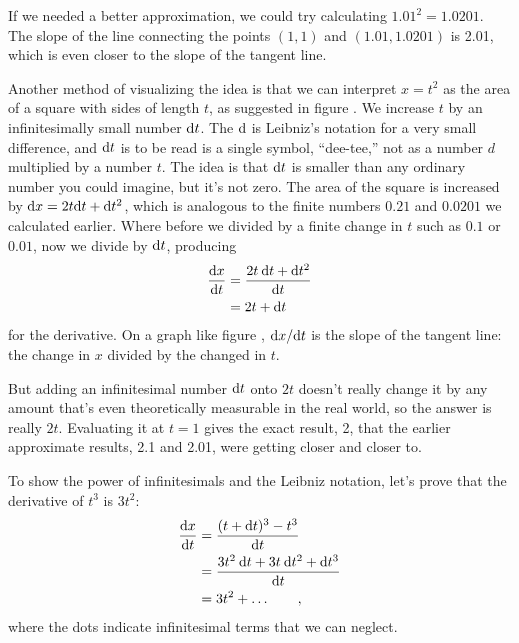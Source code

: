 If we needed a better approximation, we could try calculating $1.01^2=1.0201$. The slope of the
line connecting the points $(1,1)$ and $(1.01,1.0201)$ is 2.01, which is even closer to the slope of the tangent line.

%
%
Another method of visualizing the idea is that we can interpret $x=t^2$ as the area of a square with sides of length $t$,
as suggested in figure . We increase $t$ by an infinitesimally small number $\textup{d} t$.
The $\textup{d}$ is Leibniz's notation for a very small difference,
and $\textup{d} t$ is to be read is a single symbol,
``dee-tee,'' not as a number $d$ multiplied by a number $t$. The idea is that $\textup{d} t$ is smaller than any ordinary
number you could imagine, but it's not zero. The area of the square is increased by $\textup{d} x = 2t\textup{d} t +\textup{d} t^2$, which is
analogous to the finite numbers $0.21$ and $0.0201$ we calculated earlier. Where before we divided by a finite
change in $t$ such as $0.1$ or $0.01$, now we divide by $\textup{d} t$, producing
\begin{align*}
  \frac{\textup{d} x}{\textup{d} t} &=  \frac{2t\:\textup{d} t +\textup{d} t^2}{\textup{d} t} \\
                        &= 2t+\textup{d} t
\end{align*}
for the derivative. On a graph like figure , $\textup{d} x/\textup{d} t$ is the slope of the tangent line: the change
in $x$ divided by the changed in $t$.

But adding an infinitesimal number $\textup{d} t$ onto $2t$ doesn't really change it by any amount that's
even theoretically measurable in the real world, so the answer is really $2t$. Evaluating it at $t=1$ gives the exact result, 2,
that the earlier approximate results, 2.1 and 2.01, were getting closer and closer to.

\begin{eg}\label{eg:third-power}
To show the power of infinitesimals and the Leibniz notation, let's prove that the derivative of $t^3$ is $3t^2$:
\begin{align*}
  \frac{\textup{d} x}{\textup{d} t} &= \frac{(t+\textup{d} t)^3-t^3}{\textup{d} t} \\
                        &= \frac{3t^2\:\textup{d} t + 3t\:\textup{d} t^2 + \textup{d} t^3}{\textup{d} t} \\
                        &= 3t^2 + \ldots \qquad ,
\end{align*}
where the dots indicate infinitesimal terms that we can neglect.
\end{eg}

